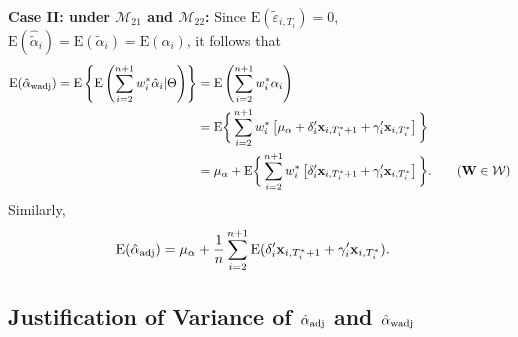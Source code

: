 \documentclass[11pt]{article}
\def\mbf#1{\mathbf{#1}} %
\def\mrm#1{\mathrm{#1}} %
\def\mc#1{\mathcal{#1}} %
\def\E#1{\mathrm{E}(#1)} %
\theoremstyle{definition}
\begin{document}
\noindent \textbf{Case II: under $\mc{M}_{21}$ and $\mc{M}_{22}$:} Since $\E{\tilde{\varepsilon}_{i, T_i}}=0$, $\E{\hat{\tilde{\alpha}}_{i}}=\E{\tilde{\alpha}_{i}}=\E{\alpha_{i}}$, it follows that
  \begin{align*}
   \E{\hat{\alpha}_{\rm wadj}}= \mrm{E}\left\{\mrm{E}\left(\sum_{i=2}^{n+1} w_i^*\hat{\alpha}_i|\Theta\right)\right\}
   &= \mrm{E}\left( \sum_{i=2}^{n+1} w_i^*\alpha_i\right)\\
   &= \mrm{E}\bigg\{ \sum_{i=2}^{n+1} w_i^*\left[\mu_{\alpha}+\delta_{i}'\mbf{x}_{i, T_i^*+1}+\gamma_i'\mbf{x}_{i, T^*_i}\right]\bigg\}\\
   &=\mu_{\alpha}+\mrm{E}\bigg\{ \sum_{i=2}^{n+1} w_i^*\left[\delta_{i}'\mbf{x}_{i, T_i^*+1}+\gamma_i'\mbf{x}_{i, T^*_i}\right]\bigg\}.\tag{$\mbf{W}\in \mc{W}$}
   \end{align*}
Similarly,
  \begin{align*}
   \E{\hat{\alpha}_{\rm adj}}
   &=\mu_{\alpha}+\frac{1}{n}\sum_{i=2}^{n+1} \E{\delta_{i}'\mbf{x}_{i, T_i^*+1}+\gamma_i'\mbf{x}_{i, T^*_i}}.
   \end{align*}


\subsection{Justification of Variance of $\hat{\alpha}_{\rm adj}$ and $\hat{\alpha}_{\rm wadj}$}
\label{var}
\end{document}

